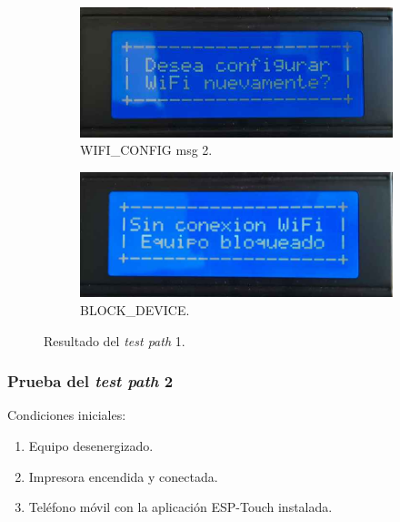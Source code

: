 \begin{figure}[!htpb]
\begin{subfigure}[b]{0.4\textwidth}
     \end{subfigure}
          \hfill
     \begin{subfigure}[b]{0.4\textwidth}
         \centering
         \includegraphics[width=1.1\textwidth]{./Figures/Conf_WiFi_nueva.jpeg}
         \caption{WIFI\_CONFIG msg 2.}
         \label{fig:pruIni_1_4}
     \end{subfigure}
          \hfill
     \begin{subfigure}[b]{0.4\textwidth}
         \centering
         \includegraphics[width=1.1\textwidth]{./Figures/Sin_Conex_WiFi_Eq_Bloq.jpeg}
         \caption{BLOCK\_DEVICE.}
         \label{fig:pruIni_1_5}
     \end{subfigure}
        \caption{Resultado del \textit{test path} 1.}
        \label{fig:pruIni_1_res}
\end{figure}



\subsubsection{Prueba del \textit{test path} 2}
\label{subsubsec:pruIni_2}

Condiciones iniciales: 

\begin{enumerate}
	\item Equipo desenergizado.
	\item Impresora encendida y conectada.
	\item Teléfono móvil con la aplicación ESP-Touch instalada.
\end{enumerate}

